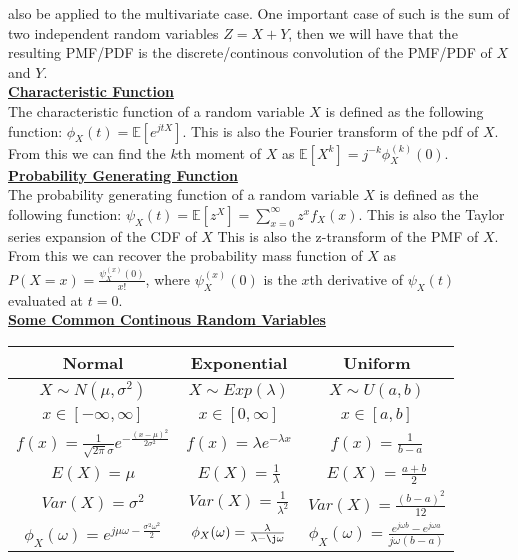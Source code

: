 \documentclass[9.5pt]{article}
\begin{document}
also be applied to the multivariate case. One important case of such is the 
sum of two independent random variables $Z=X+Y$, then we will have
that the resulting PMF/PDF is the discrete/continous convolution of the PMF/PDF of $X$ and $Y$.\\
\underline{\textbf{Characteristic Function}}\\
The characteristic function of a random variable $X$ is defined 
as the following function: $\phi_X(t)=\mathbb{E}[e^{jtX}]$. This is 
also the Fourier transform of the pdf of $X$. From this we can
find the $k$th moment of $X$ as $\mathbb{E}[X^k]=j^{-k}\phi_X^{(k)}(0)$.\\
\underline{\textbf{Probability Generating Function}}\\
The probability generating function of a random variable $X$ is defined as the following function:
$\psi_X(t)=\mathbb{E}[z^X]=\sum_{x=0}^{\infty}z^xf_X(x)$. This is also the Taylor series expansion of the CDF of $X$
This is also the z-transform of the PMF of $X$. From this we can recover
the probability mass function of $X$ as $P(X=x)=\frac{\psi_X^{(x)}(0)}{x!}$, 
where $\psi_X^{(x)}(0)$ is the $x$th derivative of $\psi_X(t)$ evaluated at $t=0$.\\
\underline{\textbf{Some Common Continous Random Variables}}\\
\begin{tabular}{ | c| c | c |}
Normal & Exponential & Uniform \\
\hline
$X\sim N(\mu,\sigma^2)$ & $X\sim Exp(\lambda)$ & $X\sim U(a,b)$ \\

$x\in [-\infty ,\infty]$ & $x\in [0,\infty]$ & $x\in [a,b]$ \\

$f(x)=\frac{1}{\sqrt{2\pi}\sigma}e^{-\frac{(x-\mu)^2}{2\sigma^2}}$ & $f(x)=\lambda e^{-\lambda x}$ & $f(x)=\frac{1}{b-a}$ \\

$E(X)=\mu$ & $E(X)=\frac{1}{\lambda}$ & $E(X)=\frac{a+b}{2}$\\

$Var(X)=\sigma^2$ & $Var(X)=\frac{1}{\lambda^2}$ & $Var(X)=\frac{(b-a)^2}{12}$\\
$\phi_X(\omega)=e^{j\mu\omega-\frac{\sigma^2\omega^2}{2}}$ & $\phi_X(\omega)=\frac{\lambda}{\lambda-\j\omega}$ & $\phi_X(\omega)=\frac{e^{j\omega b}-e^{j\omega a}}{j\omega(b-a)}$\\
\hline
\end{tabular}
\end{document}

